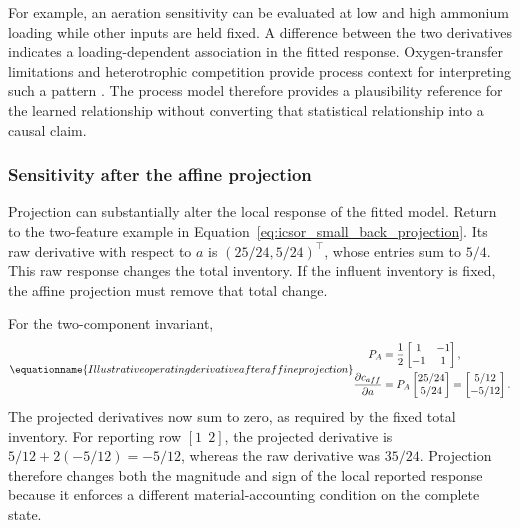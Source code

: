 For example, an aeration sensitivity can be evaluated at low and high ammonium loading while other inputs are held fixed. A difference between the two derivatives indicates a loading-dependent association in the fitted response. Oxygen-transfer limitations and heterotrophic competition provide process context for interpreting such a pattern \citep{StenstromSong1991}. The process model therefore provides a plausibility reference for the learned relationship without converting that statistical relationship into a causal claim.

\subsubsection{Sensitivity after the affine projection}

Projection can substantially alter the local response of the fitted model. Return to the two-feature example in Equation~\eqref{eq:icsor_small_back_projection}. Its raw derivative with respect to \(a\) is \((25/24,5/24)^\top\), whose entries sum to \(5/4\). This raw response changes the total inventory. If the influent inventory is fixed, the affine projection must remove that total change.

For the two-component invariant,
\begin{equation}
\equationname{Illustrative operating derivative after affine projection}
\label{eq:icsor_small_projection_derivative}
\begin{aligned}
P_A&=\frac{1}{2}\begin{bmatrix}1&-1\\-1&1\end{bmatrix},\\
\frac{\partial c_{aff}}{\partial a}
&=P_A\begin{bmatrix}25/24\\5/24\end{bmatrix}
=\begin{bmatrix}5/12\\-5/12\end{bmatrix}.
\end{aligned}
\end{equation}
The projected derivatives now sum to zero, as required by the fixed total inventory. For reporting row \([1\ \ 2]\), the projected derivative is \(5/12+2(-5/12)=-5/12\), whereas the raw derivative was \(35/24\). Projection therefore changes both the magnitude and sign of the local reported response because it enforces a different material-accounting condition on the complete state.

